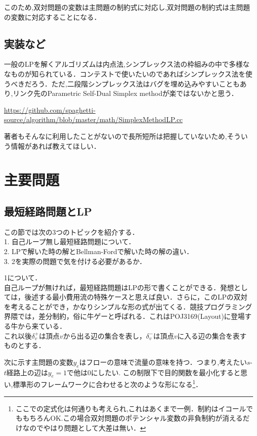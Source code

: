 \documentclass[13pt]{jarticle}
\theoremstyle{nonitalic} %
\begin{document}
このため,双対問題の変数は主問題の制約式に対応し,双対問題の制約式は主問題の変数に対応することになる．

\subsection{実装など}
一般のLPを解くアルゴリズムは内点法,シンプレックス法の枠組みの中で多様ななものが知られている．コンテストで使いたいのであればシンプレックス法を使うべきだろう．ただ,二段階シンプレックス法はバグを埋め込みやすいこともあり,リンク先のParametric Self-Dual Simplex methodが楽ではないかと思う．

\url{https://github.com/spaghetti-source/algorithm/blob/master/math/SimplexMethodLP.cc}

著者もそんなに利用したことがないので長所短所は把握していないため,そういう情報があれば教えてほしい．

\section{主要問題}

\subsection{最短経路問題とLP}
\label{sec:shortpath}
この節では次の3つのトピックを紹介する． \\
1. 自己ループ無し最短経路問題について． \\
2. LPで解いた時の解とBellman-Fordで解いた時の解の違い．\\
3. 2を実際の問題で気を付ける必要があるか．


1について．\\
自己ループが無ければ，最短経路問題はLPの形で書くことができる．発想としては，後述する最小費用流の特殊ケースと思えば良い．さらに，このLPの双対を考えることができ，かなりシンプルな形の式が出てくる．競技プログラミング界隈では，差分制約，俗に牛ゲーと呼ばれる．これはPOJ3169(Layout)に登場する牛から来ている． \\

これ以後$\delta_{v}^+$は頂点$v$から出る辺の集合を表し，$\delta_{v}^-$は頂点$v$に入る辺の集合を表すものとする．

次に示す主問題の変数$y_e$はフローの意味で流量の意味を持つ．つまり,考えたい$s$-$t$経路上の辺は$y_e=1$で他は0にしたい. この制限下で目的関数を最小化すると思い,標準形のフレームワークに合わせると次のような形になる\footnote{ここでの定式化は何通りも考えられ,これはあくまで一例．制約はイコールでももちろんOK.この場合双対問題のポテンシャル変数の非負制約が消えるだけなのでやはり問題として大差は無い．}．
\end{document}
